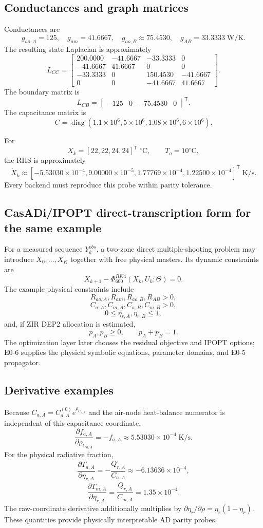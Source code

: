 \documentclass[11pt]{article}
\newcommand{\diagmat}{\operatorname{diag}}
\begin{document}
\subsection{Conductances and graph matrices}
Conductances are
\[
g_{ao,A}=125,
\quad g_{am}=41.6667,
\quad g_{ao,B}\approx75.4530,
\quad g_{AB}=33.3333\;\text{W/K}.
\]
The resulting state Laplacian is approximately
\[
\boxed{
L_{CC}=\begin{bmatrix}
200.0000&-41.6667&-33.3333&0\\
-41.6667&41.6667&0&0\\
-33.3333&0&150.4530&-41.6667\\
0&0&-41.6667&41.6667
\end{bmatrix}.
}
\]
The boundary matrix is
\[
\boxed{
L_{CB}=\begin{bmatrix}-125&0&-75.4530&0\end{bmatrix}^{\mathsf T}.
}
\]
The capacitance matrix is
\[
C=\diagmat(1.1\!\times\!10^6,5\!\times\!10^6,
1.08\!\times\!10^6,6\!\times\!10^6).
\]

For
\[
X_k=[22,22,24,24]^{\mathsf T}\;^\circ\mathrm C,
\qquad T_o=10^\circ\mathrm C,
\]
the RHS is approximately
\[
\boxed{
\dot X_k\approx
[-5.53030\times10^{-4},
9.00000\times10^{-5},
1.77769\times10^{-4},
1.22500\times10^{-4}]^{\mathsf T}\;\text{K/s}.
}
\]
Every backend must reproduce this probe within parity tolerance.

\subsection{CasADi/IPOPT direct-transcription form for the same example}
For a measured sequence $Y_k^{obs}$, a two-zone direct multiple-shooting problem
may introduce $X_0,\ldots,X_K$ together with free physical masters. Its dynamic
constraints are
\[
\boxed{X_{k+1}-\Phi^{RK4}_{600}(X_k,U_k;\Theta)=0.}
\]
The example physical constraints include
\[
R_{ao,A},R_{am},R_{ao,B},R_{AB}>0,
\]
\[
C_{a,A},C_{m,A},C_{a,B},C_{m,B}>0,
\]
\[
0\le\eta_{r,A},\eta_{r,B}\le1,
\]
and, if ZIR DEP2 allocation is estimated,
\[
p_A,p_B\ge0,\qquad p_A+p_B=1.
\]
The optimization layer later chooses the residual objective and IPOPT options;
E0-6 supplies the physical symbolic equations, parameter domains, and E0-5
propagator.

\subsection{Derivative examples}
Because $C_{a,A}=C_{a,A}^{(0)}e^{\rho_{C_{a,A}}}$ and the air-node heat-balance
numerator is independent of this capacitance coordinate,
\[
\boxed{
\frac{\partial f_{a,A}}{\partial\rho_{C_{a,A}}}=-f_{a,A}
\approx5.53030\times10^{-4}\;\text{K/s}.
}
\]
For the physical radiative fraction,
\[
\frac{\partial \dot T_{a,A}}{\partial\eta_{r,A}}
=-\frac{Q_{r,A}}{C_{a,A}}
\approx-6.13636\times10^{-4},
\]
\[
\frac{\partial \dot T_{m,A}}{\partial\eta_{r,A}}
=\frac{Q_{r,A}}{C_{m,A}}
=1.35\times10^{-4}.
\]
The raw-coordinate derivative additionally multiplies by
$\partial\eta_r/\partial\rho=\eta_r(1-\eta_r)$.
These quantities provide physically interpretable AD parity probes.
\end{document}
